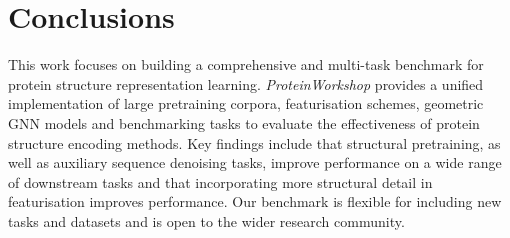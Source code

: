 \section{Conclusions}

This work focuses on building a comprehensive and multi-task benchmark for protein structure representation learning. \emph{ProteinWorkshop} provides a unified implementation of large pretraining corpora, featurisation schemes, geometric GNN models and benchmarking tasks to evaluate the effectiveness of protein structure encoding methods.
Key findings include that structural pretraining, as well as auxiliary sequence denoising tasks, improve performance on a wide range of downstream tasks and that incorporating more structural detail in featurisation improves performance.
Our benchmark is flexible for including new tasks and datasets and is open to the wider research community.



